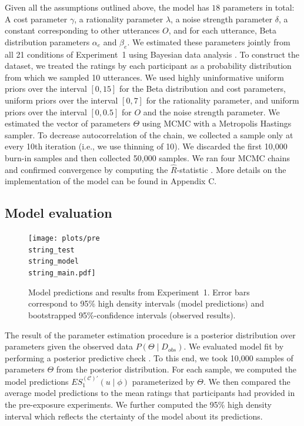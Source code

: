 \documentclass[man, floatsintext]{apa6}
\begin{document}
Given all the assumptions outlined above, the model has  $18$ parameters in total: A cost parameter $\gamma$, a rationality parameter $\lambda$, a noise strength parameter $\delta$, a constant corresponding to other utterances $O$, and for each utterance, Beta distribution parameters $\alpha_e$ and $\beta_e$. We estimated these parameters jointly from all 21 conditions of Experiment~1 using Bayesian data analysis \parencite[BDA; see, e.g.,][]{Kruschke2015}. To construct the dataset, we treated the ratings by each participant as a probability distribution from which we sampled 10 utterances. We used highly uninformative
uniform priors over the interval $[0,15]$ for the Beta distribution and cost parameters, uniform priors over the interval $[0,7]$ for the rationality parameter, and uniform priors over the interval $[0,0.5]$ for $O$ and the noise strength parameter. We estimated the vector of parameters $\Theta$ using MCMC with a Metropolis Hastings sampler. To decrease autocorrelation of the chain, we collected a sample only at every 10th iteration (i.e., we use thinning of 10). We discarded the first 10,000 burn-in samples and then collected 50,000 samples.  We ran four MCMC chains and confirmed convergence by computing the $\hat{R}$-statistic \parencite{Gelman2003}. More details on the implementation of the model can be found in Appendix C.

\subsection{Model evaluation}



\begin{figure}[th!]
\texttt{[image: plots/pre\\string\_test\\string\_model\\string\_main.pdf]}
\caption{Model predictions and results from Experiment~1. Error bars correspond to 95\% high density intervals (model predictions) and bootstrapped 95\%-confidence intervals (observed results). \label{fig:norming-results-model-main}}

\end{figure}


The result of the parameter estimation procedure is a posterior distribution over parameters given the observed data $P(\Theta \mid D_{obs})$. We evaluated
 model fit by performing a posterior predictive check \parencite[PPC;][]{Kruschke2015}. To this end, we took 10,000 samples of parameters $\Theta$ from the posterior distribution. For each sample, we computed the model predictions $ES_1^{(\mathscr{C})'}(u \mid \phi)$ parameterized by $\Theta$. We then compared the average model predictions to the
mean ratings that participants had provided in the pre-exposure experiments. We further computed the 95\% high density interval  \parencite[HDI;][]{Kruschke2015} which reflects the ctertainty of the model
about its predictions.
\end{document}
